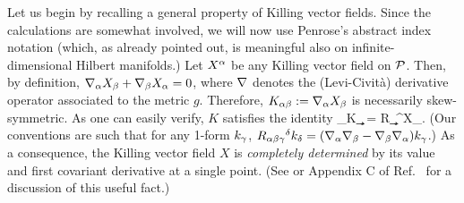 Let us begin by recalling a general property of Killing vector fields.
Since the calculations are somewhat involved, we will now use
Penrose's abstract index notation (which, as already pointed out, is
meaningful also on infinite-dimensional Hilbert manifolds.)  Let
$X^\a$ be any Killing vector field on $\P$.  Then, by definition,
$\grad_\a X_\b + \grad_\b X_\a = 0$, where $\grad$ denotes the
(Levi-Civit\`a) derivative operator associated to the metric $g$.
Therefore, $K_{\a\b} := \grad_\a X_\b$ is necessarily skew-symmetric.
As one can easily verify,\cite{wald} $K$ satisfies the identity%
%
\be
\grad_\a K_{\b\c} = R_{\c\b\a}{}^\de X_\de.
\ee
%
(Our conventions are such that for any 1-form $k_\c$,
$R_{\a\b\c}{}^\delta k_\delta = (\grad_\a \grad_\b - \grad_\b
\grad_\a) k_\c$.)  As a consequence, the Killing vector field $X$ is
{\em completely determined} by its value and first covariant
derivative at a single point.  (See \cite{ashtekar} or Appendix C of
Ref.~\cite{wald} for a discussion of this useful fact.)

